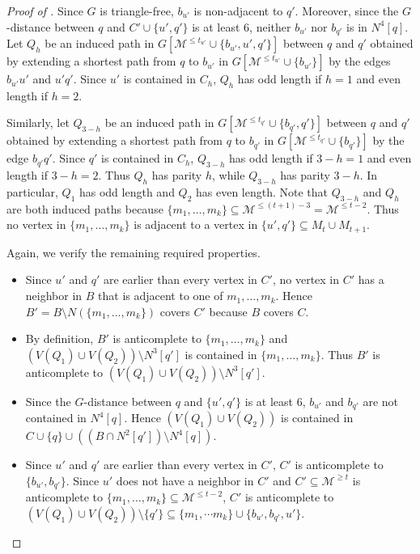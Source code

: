 \documentclass{article}
\begin{document}
\begin{proof}[Proof of ]
Since $G$ is triangle-free, $b_{u'}$ is non-adjacent to $q'$. Moreover, since the $G$-distance between $q$ and $C' \cup \{u', q'\}$ is at least $6$, neither $b_{u'}$ nor $b_{q'}$ is in $N^4[q]$.
Let $Q_{h}$ be an induced path in $G[\mathcal{M}^{\leq t_{u'}} \cup \{b_{u'}, u', q'\}]$ between $q$ and $q'$ obtained by extending a shortest path from $q$ to $b_{u'}$ in $G[\mathcal{M}^{\leq t_{u'}} \cup \{b_{u'}\}]$ by the edges $b_{u'}u'$ and $u'q'$. Since $u'$ is contained in $C_h$, $Q_{h}$ has odd length if $h = 1$ and even length if $h = 2$.

Similarly, let $Q_{3 - h}$ be an induced path in $G[\mathcal{M}^{\leq t_{q'}} \cup \{b_{q'}, q'\}]$ between $q$ and $q'$ obtained by extending a shortest path from $q$ to $b_{q'}$ in $G[\mathcal{M}^{\leq t_{q'}} \cup \{b_{q'}\}]$ by the edge $b_{q'}q'$. Since $q'$ is contained in $C_h$, $Q_{3 - h}$ has odd length if $3 - h = 1$ and even length if $3 - h = 2$. Thus \(Q_h\) has parity \(h\), while \(Q_{3-h}\) has parity \(3-h\). In particular, \(Q_1\) has odd length and \(Q_2\) has even length.
Note that $Q_{3 - h}$ and $Q_{h}$ are both induced paths because $\{m_1, \dots, m_k \} \subseteq \mathcal{M}^{\leq (t + 1) - 3} = \mathcal{M}^{\leq t - 2}$. Thus no vertex in $\{m_1, \dots, m_k\}$ is adjacent to a vertex in $\{u', q'\} \subseteq M_t \cup M_{t + 1}$.

Again, we verify the remaining required properties.

\begin{itemize}
    \item Since $u'$ and $q'$ are earlier than every vertex in $C'$, no vertex in $C'$ has a neighbor in $B$ that is adjacent to one of $m_1, \dots, m_k$. Hence $B'= B \setminus N(\{m_1, \dots, m_{k}\})$ covers $C'$ because $B$ covers $C$.
    \item By definition, $B'$ is anticomplete to $\{m_1, \dots, m_k\}$ and $\left( V(Q_1) \cup V(Q_2) \right) \setminus N^3[q']$ is contained in $\{ m_1, \dots, m_k\}$. Thus $B'$ is anticomplete to $\left( V(Q_1) \cup V(Q_2) \right) \setminus N^3[q']$.
    \item Since the $G$-distance between $q$ and $\{u', q'\}$ is at least 6, $b_{u'}$ and $b_{q'}$ are not contained in $N^4[q]$. Hence $\left( V(Q_1) \cup V(Q_2) \right)$ is contained in $C \cup \{q\} \cup ((B \cap N^2[q']) \setminus N^4[q])$.
    \item Since $u'$ and $q'$ are earlier than every vertex in $C'$, $C'$ is anticomplete to $\{b_{u'}, b_{q'}\}$. Since $u'$ does not have a neighbor in $C'$ and $C' \subseteq \mathcal{M}^{\geq t}$ is anticomplete to $\{m_1, \dots, m_k\} \subseteq \mathcal{M}^{\leq t- 2}$, $C'$ is anticomplete to $\left( V(Q_1) \cup V(Q_2) \right) \setminus \{q'\} \subseteq \{m_1, \dotsm m_k\} \cup \{b_{u'}, b_{q'}, u'\}.$
\end{itemize}
\end{proof}
\end{document}

